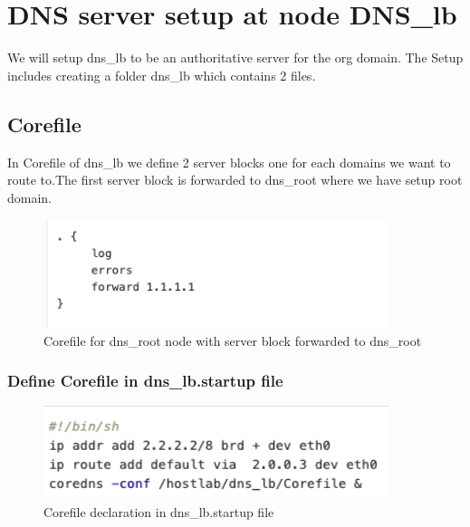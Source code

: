 \section{DNS server setup at node DNS\_lb }
We will setup dns\_lb to be an authoritative server for the org domain.
The Setup includes creating a folder dns\_lb which contains 2 files.
\subsection{Corefile}
In Corefile of dns\_lb we define 2 server blocks one for each domains we want to route to.The first server block is forwarded to dns\_root where we have setup root domain.
 \begin{figure}[H]
\centering
  \includegraphics[width=0.9\textwidth]{Images/corefile dns_lb part1.png}
  \caption{Corefile for dns\_root node with server block forwarded to dns\_root}
  \label{fig:2.9}
\end{figure}
\subsubsection{Define Corefile in dns\_lb.startup file}
 \begin{figure}[H]
\centering
  \includegraphics[width=0.9\textwidth]{Images/Corefile declaration in dns_lb.png}
  \caption{Corefile declaration in dns\_lb.startup file}
  \label{fig:2.10}
\end{figure}
